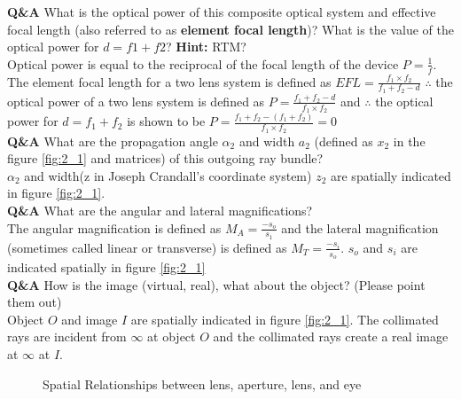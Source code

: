 \documentclass[main.tex]{subfiles}
\begin{document}
\newpage

\textbf{Q\&A} What is the optical power of this composite optical system and effective focal length (also referred to as \textbf{element focal length})? What is the value of the optical power for $d=f1+f2$? \textbf{Hint:} RTM?\\

Optical power is equal to the reciprocal of the focal length of the device $P=\frac{1}{f}$. The element focal length for a two lens system is defined as $EFL = \frac{f_1 \times f_2}{f_1 + f_2 - d}$ $\therefore$ the optical power of a two lens system is defined as $P=\frac{f_1 + f_2 -d}{f_1 \times f_2}$ and $\therefore$ the optical power for $d=f_1 + f_2$ is shown to be $P=\frac{f_1 + f_2 - (f_1 + f_2)}{f_1 \times f_2} = 0$\\

\textbf{Q\&A} What are the propagation angle $\alpha_2$ and width $a_2$ (defined as $x_2$ in the figure \ref{fig:2_1} and matrices) of this outgoing ray bundle? \\

$\alpha_2$ and width(z in Joseph Crandall's coordinate system) $z_2$ are spatially indicated in figure \ref{fig:2_1}.\\

\textbf{Q\&A} What are the angular and lateral magnifications?\\

The angular magnification is defined as $M_A = \frac{-s_o}{s_1}$ and the lateral magnification (sometimes called linear or transverse) is defined as $M_T = \frac{-s_i}{s_o}$. $s_o$ and $s_i$ are indicated spatially in figure \ref{fig:2_1}\\

\textbf{Q\&A} How is the image (virtual, real), what about the object? (Please point them out)\\

Object $O$ and image $I$ are spatially indicated in figure \ref{fig:2_1}. The collimated rays are incident from $\infty$ at object $O$ and the collimated rays create a real image at $\infty$ at $I$. 


\newpage

\begin{figure}
\centering{}
\caption{Spatial Relationships between lens, aperture, lens, and eye}
\label{fig:2_2}
\end{figure}
\end{document}

